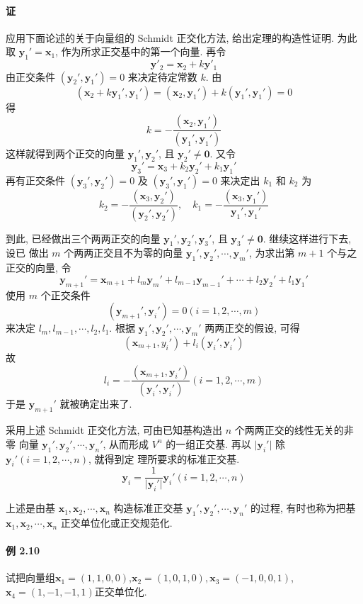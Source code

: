 \paragraph*{证} 应用下面论述的关于向量组的 Schmidt 正交化方法, 给出定理的构造性证明. 为此取 $\bm{y}_1' = \bm{x}_1$, 作为所求正交基中的第一个向量. 再令
$$
    \bm{y}'_2 = \bm{x}_2 + k\bm{y}'_1
$$
由正交条件 $(\bm{y}_2', \bm{y}_1') = 0$ 来决定待定常数 $k$. 由
$$
    (\bm{x}_2 + k\bm{y}_1', \bm{y}_1') = (\bm{x}_2, \bm{y}_1') + k(\bm{y}_1', \bm{y}_1') = 0
$$
得
$$
    k = -\dfrac{(\bm{x}_2, \bm{y}_1')}{(\bm{y}_1', \bm{y}_1')}
$$
这样就得到两个正交的向量 $\bm{y}_1', \bm{y}_2'$, 且 $\bm{y}_2' \neq \bm{0}$. 又令
$$
    \bm{y}_3' = \bm{x}_3 + k_2\bm{y}_2' + k_1\bm{y}_1'
$$
再有正交条件 $(\bm{y}_3', \bm{y}_2') = 0$ 及 $(\bm{y}_3', \bm{y}_1') = 0$ 来决定出 $k_1$ 和 $k_2$ 为
$$
    k_2 = -\dfrac{(\bm{x}_3, \bm{y}_2')}{(\bm{y}_2', \bm{y}_2')}, \quad k_1 = -\dfrac{(\bm{x}_3, \bm{y}_1')}{\bm{y}_1', \bm{y}_1'}
$$
\par 到此, 已经做出三个两两正交的向量 $\bm{y}_1', \bm{y}_2', \bm{y}_3'$, 且 $\bm{y}_3' \neq \bm{0}$. 继续这样进行下去, 设已
做出 $m$ 个两两正交且不为零的向量 $\bm{y}_1', \bm{y}_2', \cdots, \bm{y}_m'$, 为求出第 $m + 1$ 个与之正交的向量, 令
$$
    \bm{y}_{m+1}' = \bm{x}_{m+1} + l_m\bm{y}_m' + l_{m -1}\bm{y}_{m-1}' + \cdots + l_2\bm{y}_2' + l_1\bm{y}_1'
$$
使用 $m$ 个正交条件
$$
    (\bm{y}_{m+1}', \bm{y}_i') = 0 (i = 1,2,\cdots, m)
$$
来决定 $l_m, l_{m-1}, \cdots, l_2, l_1$. 根据 $\bm{y}_1', \bm{y}_2', \cdots, \bm{y}_m'$ 两两正交的假设, 可得
$$
    (\bm{x}_{m+1},y_i') + l_i(\bm{y}_i', \bm{y}_i')
$$
故
$$
    l_i = -\dfrac{(\bm{x}_{m+1}, \bm{y}_i')}{(\bm{y}_i', \bm{y}_i')} (i = 1,2,\cdots, m)
$$
于是 $\bm{y}_{m+1}'$ 就被确定出来了.

\par 采用上述 Schmidt 正交化方法, 可由已知基构造出 $n$ 个两两正交的线性无关的非零
向量 $\bm{y}_1', \bm{y}_2', \cdots, \bm{y}_n'$, 从而形成 $V^n$ 的一组正交基. 再以 $\lvert \bm{y}_i' \rvert$ 除 $\bm{y}_i'(i = 1,2,\cdots, n)$, 就得到定
理所要求的标准正交基.
$$
    \bm{y}_i = \dfrac{1}{\lvert \bm{y}_i' \rvert} \bm{y}_i' (i = 1,2,\cdots, n)
$$

\par 上述是由基 $\bm{x}_1, \bm{x}_2, \cdots, \bm{x}_n$ 构造标准正交基 $\bm{y}_1', \bm{y}_2', \cdots, \bm{y}_n'$ 的过程, 有时也称为把基 $\bm{x}_1, \bm{x}_2, \cdots, \bm{x}_n$ 正交单位化或正交规范化.

\paragraph*{例 2.10} 试把向量组$\bm{x}_1 = (1, 1, 0, 0)$,$\bm{x}_2 = (1, 0, 1, 0),\bm{x}_3 = (-1, 0, 0, 1)$,$\bm{x}_4 =
    (1,-1, -1, 1)$正交单位化.

